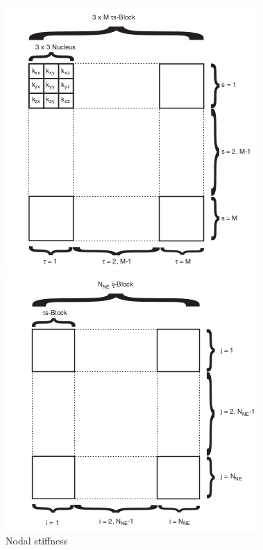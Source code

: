 \documentclass[a4paper,12pt]{article}
\begin{document}
\begin{figure}[!htbp]
  \centering
  \begin{minipage}[b]{0.35\textwidth}
    \includegraphics[width=\textwidth]{3.png}
    \caption{Nodal stiffness}
  \end{minipage}
  \hfill
  \begin{minipage}[b]{0.35\textwidth}
    \includegraphics[width=\textwidth]{4.png}

\end{minipage}
\end{figure}
\end{document}
